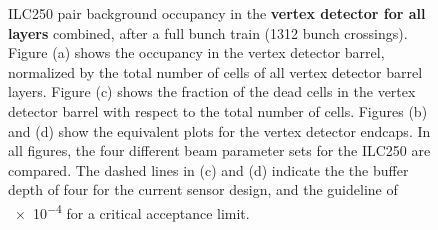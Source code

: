 \begin{figure}
\begin{subfigure}[b]{0.49\textwidth}
   \end{subfigure}
   \caption[Pair background occupancy in the \sid vertex detector for the ILC250]{ILC250 pair background occupancy in the \textbf{\sid vertex detector for all layers} combined, after a full bunch train (\num{1312} bunch crossings).
   Figure (a) shows the occupancy in the vertex detector barrel, normalized by the total number of cells of all vertex detector barrel layers.
   Figure (c) shows the fraction of the dead cells in the vertex detector barrel with respect to the total number of cells.
   Figures (b) and (d) show the equivalent plots for the vertex detector endcaps.
   In all figures, the four different beam parameter sets for the ILC250 are compared.
   The dashed lines in (c) and (d) indicate the the buffer depth of four for the current sensor design, and the guideline of \num{e-4} for a critical acceptance limit.
   }
   \label{fig:PairBkg:ILC250_Occupancy}
 \end{figure}
